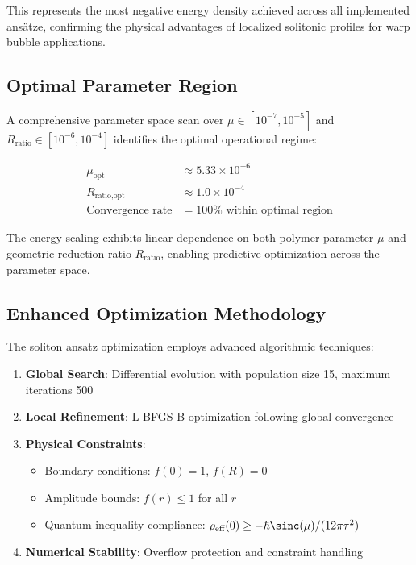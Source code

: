 \documentclass[12pt,a4paper]{article}
\begin{document}
This represents the most negative energy density achieved across all implemented ansätze, confirming the physical advantages of localized solitonic profiles for warp bubble applications.

\subsection{Optimal Parameter Region}

A comprehensive parameter space scan over $\mu \in [10^{-7}, 10^{-5}]$ and $R_{\text{ratio}} \in [10^{-6}, 10^{-4}]$ identifies the optimal operational regime:

\begin{align}
\mu_{\text{opt}} &\approx 5.33 \times 10^{-6} \\
R_{\text{ratio,opt}} &\approx 1.0 \times 10^{-4} \\
\text{Convergence rate} &= 100\% \text{ within optimal region}
\end{align}

The energy scaling exhibits linear dependence on both polymer parameter $\mu$ and geometric reduction ratio $R_{\text{ratio}}$, enabling predictive optimization across the parameter space.

\subsection{Enhanced Optimization Methodology}

The soliton ansatz optimization employs advanced algorithmic techniques:

\begin{enumerate}
\item \textbf{Global Search}: Differential evolution with population size 15, maximum iterations 500
\item \textbf{Local Refinement}: L-BFGS-B optimization following global convergence
\item \textbf{Physical Constraints}:
   \begin{itemize}
   \item Boundary conditions: $f(0) = 1$, $f(R) = 0$
   \item Amplitude bounds: $f(r) \leq 1$ for all $r$
   \item Quantum inequality compliance: $\rho_{\text{eff}}(0) \geq -\hbar\sinc(\mu)/(12\pi\tau^2)$
   \end{itemize}
\item \textbf{Numerical Stability}: Overflow protection and constraint handling
\end{enumerate}
\end{document}
